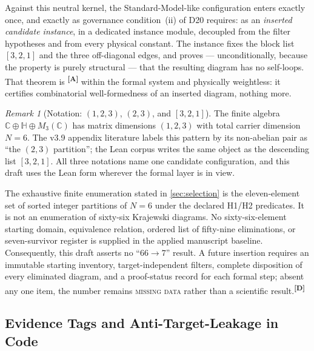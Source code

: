 \documentclass[12pt,a4paper,twoside]{article}
\theoremstyle{plain}
\theoremstyle{definition}
\theoremstyle{remark}
\newtheorem{remark}[theorem]{Remark}
\newcommand{\catmark}[1]{\textsuperscript{\textsf{\textbf{[#1]}}}}
\begin{document}
Against this neutral kernel, the Standard-Model-like configuration enters
exactly once, and exactly as governance condition~(ii) of D20 requires: as
an \emph{inserted candidate instance}, in a dedicated instance module,
decoupled from the filter hypotheses and from every physical constant. The
instance fixes the block list $[3,2,1]$ and the three off-diagonal edges,
and proves --- unconditionally, because the property is purely structural
--- that the resulting diagram has no self-loops. That theorem is
\catmark{A} within the formal system and physically weightless: it
certifies combinatorial well-formedness of an inserted diagram, nothing
more.

\begin{remark}[{Notation: $(1,2,3)$, $(2,3)$, and $[3,2,1]$}]
\label{rem:partition-notation}
The finite algebra $\mathbb C \oplus \mathbb H \oplus M_3(\mathbb C)$ has
matrix dimensions $(1,2,3)$ with total carrier dimension $N = 6$. The
v3.9 appendix literature labels this pattern by its non-abelian pair as
``the $(2,3)$ partition''; the Lean corpus writes the same object as the
descending list $[3,2,1]$. All three notations name one candidate
configuration, and this draft uses the Lean form wherever the formal layer
is in view.
\end{remark}

\begin{governancebox}
The exhaustive finite enumeration stated in \cref{sec:selection} is the
eleven-element set of sorted integer partitions of $N=6$ under the
declared H1/H2 predicates. It is not an enumeration of sixty-six
Krajewski diagrams. No sixty-six-element starting domain, equivalence
relation, ordered list of fifty-nine eliminations, or seven-survivor
register is supplied in the applied manuscript baseline. Consequently,
this draft asserts no ``$66\to7$'' result. A future insertion requires an
immutable starting inventory, target-independent filters, complete
disposition of every eliminated diagram, and a proof-status record for
each formal step; absent any one item, the number remains
\textsc{missing data} rather than a scientific result.\catmark{D}
\end{governancebox}

\subsection{Evidence Tags and Anti-Target-Leakage in Code}
\label{subsec:code-evidence}
\end{document}

